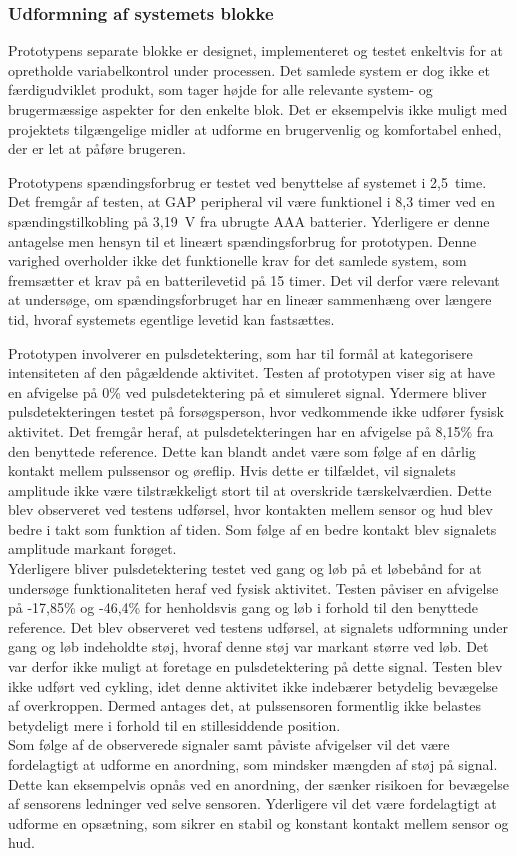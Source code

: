 \subsubsection{Udformning af systemets blokke}
Prototypens separate blokke er designet, implementeret og testet enkeltvis for at opretholde variabelkontrol under processen. Det samlede system er dog ikke et færdigudviklet produkt, som tager højde for alle relevante system- og brugermæssige aspekter for den enkelte blok. Det er eksempelvis ikke muligt med projektets tilgængelige midler at udforme en brugervenlig og komfortabel enhed, der er let at påføre brugeren.

Prototypens spændingsforbrug er testet ved benyttelse af systemet i 2,5~time. Det fremgår af testen, at GAP peripheral vil være funktionel i 8,3 timer ved en spændingstilkobling på 3,19~V fra ubrugte AAA batterier. Yderligere er denne antagelse men hensyn til et lineært spændingsforbrug for prototypen. Denne varighed overholder ikke det funktionelle krav for det samlede system, som fremsætter et krav på en batterilevetid på 15 timer. Det vil derfor være relevant at undersøge, om spændingsforbruget har en lineær sammenhæng over længere tid, hvoraf systemets egentlige levetid kan fastsættes. 

Prototypen involverer en pulsdetektering, som har til formål at kategorisere intensiteten af den pågældende aktivitet. Testen af prototypen viser sig at have en afvigelse på 0\% ved pulsdetektering på et simuleret signal. Ydermere bliver pulsdetekteringen testet på forsøgsperson, hvor vedkommende ikke udfører fysisk aktivitet. Det fremgår heraf, at pulsdetekteringen har en afvigelse på 8,15\% fra den benyttede reference. Dette kan blandt andet være som følge af en dårlig kontakt mellem pulssensor og øreflip. Hvis dette er tilfældet, vil signalets amplitude ikke være tilstrækkeligt stort til at overskride tærskelværdien. Dette blev observeret ved testens udførsel, hvor kontakten mellem sensor og hud blev bedre i takt som funktion af tiden. Som følge af en bedre kontakt blev signalets amplitude markant forøget. \\
Yderligere bliver pulsdetektering testet ved gang og løb på et løbebånd for at undersøge funktionaliteten heraf ved fysisk aktivitet. Testen påviser en afvigelse på -17,85\% og -46,4\% for henholdsvis gang og løb i forhold til den benyttede reference. Det blev observeret ved testens udførsel, at signalets udformning under gang og løb indeholdte støj, hvoraf denne støj var markant større ved løb. Det var derfor ikke muligt at foretage en pulsdetektering på dette signal. Testen blev ikke udført ved cykling, idet denne aktivitet ikke indebærer betydelig bevægelse af overkroppen. Dermed antages det, at pulssensoren formentlig ikke belastes betydeligt mere i forhold til en stillesiddende position. \\
Som følge af de observerede signaler samt påviste afvigelser vil det være fordelagtigt at udforme en anordning, som mindsker mængden af støj på signal. Dette kan eksempelvis opnås ved en anordning, der sænker risikoen for bevægelse af sensorens ledninger ved selve sensoren. Yderligere vil det være fordelagtigt at udforme en opsætning, som sikrer en stabil og konstant kontakt mellem sensor og hud. 

